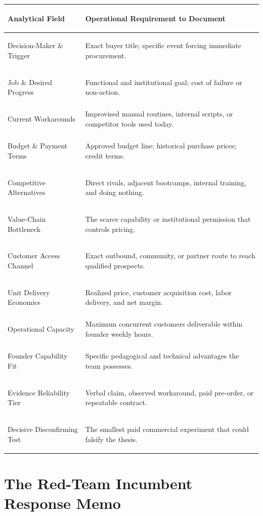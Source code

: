 \begin{tcolorbox}[
  enhanced,
  colback=BayesSurface!60,
  colframe=BayesBorder,
  boxrule=0.5pt,
  arc=3pt,
  left=3pt,right=3pt,top=3pt,bottom=3pt,
  boxsep=1pt
]
\scriptsize
\begin{tabularx}{\linewidth}{>{\bfseries\raggedright\arraybackslash}p{2.3cm} X}
\toprule
\textbf{Analytical Field} & \textbf{Operational Requirement to Document} \\
\midrule
Decision-Maker \& Trigger & Exact buyer title; specific event forcing immediate procurement. \\
\addlinespace[2pt]
Job \& Desired Progress & Functional and institutional goal; cost of failure or non-action. \\
\addlinespace[2pt]
Current Workarounds & Improvised manual routines, internal scripts, or competitor tools used today. \\
\addlinespace[2pt]
Budget \& Payment Terms & Approved budget line; historical purchase prices; credit terms. \\
\addlinespace[2pt]
Competitive Alternatives & Direct rivals, adjacent bootcamps, internal training, and doing nothing. \\
\addlinespace[2pt]
Value-Chain Bottleneck & The scarce capability or institutional permission that controls pricing. \\
\addlinespace[2pt]
Customer Access Channel & Exact outbound, community, or partner route to reach qualified prospects. \\
\addlinespace[2pt]
Unit Delivery Economics & Realized price, customer acquisition cost, labor delivery, and net margin. \\
\addlinespace[2pt]
Operational Capacity & Maximum concurrent customers deliverable within founder weekly hours. \\
\addlinespace[2pt]
Founder Capability Fit & Specific pedagogical and technical advantages the team possesses. \\
\addlinespace[2pt]
Evidence Reliability Tier & Verbal claim, observed workaround, paid pre-order, or repeatable contract. \\
\addlinespace[2pt]
Decisive Disconfirming Test & The smallest paid commercial experiment that could falsify the thesis. \\
\bottomrule
\end{tabularx}
\end{tcolorbox}

\section{The Red-Team Incumbent Response Memo}


